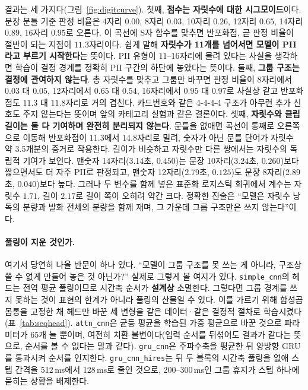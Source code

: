 \documentclass[10pt,twocolumn]{article}
\renewcommand{\emph}[1]{\textbf{#1}}
\begin{document}
결과는 세 가지다(그림~\ref{fig:digitcurve}). 첫째, \emph{점수는 자릿수에 대한 시그모이드}이다.
문장 문틀 기준 판정 비율은 4자리 $0.00$, 8자리 $0.03$, 10자리 $0.26$, 12자리 $0.65$, 14자리
$0.89$, 16자리 $0.95$로 오른다. 이 곡선에 S자 함수를 맞추면 반포화점, 곧 판정 비율이 절반이
되는 지점이 $11.3$자리이다. 쉽게 말해 \emph{자릿수가 11개를 넘어서면 모델이 PII라고 부르기
시작한다}는 뜻이다. PII 유형이
11--16자리에 몰려 있다는 사실을 생각하면 학습이 결정 경계를 정확히 PII 구간의 하단에 놓았다는
뜻이다. 둘째, \emph{그룹 구조는 결정에 관여하지 않는다}. 총 자릿수를 맞추고 그룹만 바꾸면 판정
비율이 8자리에서 $0.03$ 대 $0.05$, 12자리에서 $0.65$ 대 $0.54$, 16자리에서 $0.95$ 대 $0.97$로
사실상 같고 반포화점도 $11.3$ 대 $11.8$자리로 거의 겹친다. 카드번호와 같은 4-4-4-4 구조가
아무런 추가 신호도 주지 않는다는 뜻이며 앞의 카테고리 실험과 같은 결론이다. 셋째, \emph{자릿수와
클립 길이는 둘 다 기여하며 완전히 분리되지 않는다}. 문틀을 없애면 곡선이 통째로 오른쪽으로
이동해 반포화점이 $11.3$에서 $14.8$자리로 밀려, 숫자가 아닌 문틀 단어가 자릿수 약 3.5개분의
증거로 작용한다. 길이가 비슷하고 자릿수만 다른 쌍에서는 자릿수의 독립적 기여가 보인다. 맨숫자
14자리(3.14초, $0.450$)는 문장 10자리(3.24초, $0.260$)보다 짧으면서도 더 자주 PII로 판정되고,
맨숫자 12자리(2.79초, $0.125$)도 문장 8자리(2.89초, $0.040$)보다 높다. 그러나 두 변수를 함께
넣은 표준화 로지스틱 회귀에서 계수는 자릿수 $1.71$, 길이 $2.17$로 길이 쪽이 오히려 약간 크다.
정확한 진술은 ``모델은 자릿수 낭독의 분량과 발화 전체의 분량을 함께 재며, 그 가운데 그룹
구조만은 쓰지 않는다''이다.

\paragraph{풀링이 지운 것인가.}
여기서 당연히 나올 반문이 하나 있다. ``모델이 그룹 구조를 못 쓰는 게 아니라, 구조상 쓸 수 없게
만들어 놓은 것 아닌가?'' 실제로 그렇게 볼 여지가 있다. \texttt{simple\_cnn}의 헤드는 전역 평균
풀링이므로 시간축 순서가 \emph{설계상} 소멸한다. 그렇다면 그룹 경계를 쓰지 못하는 것이 표현의
한계가 아니라 풀링의 산물일 수 있다. 이를 가르기 위해 합성곱 몸통을 고정한 채 헤드만 바꾼 세
변형을 같은 데이터·같은 결정적 절차로 학습시켰다(표~\ref{tab:seqhead}). \texttt{attn\_cnn}은
균등 평균을 학습된 가중 평균으로 바꾼 것으로 파라미터가 65개 늘 뿐이며, 여전히 치환 불변이다(입력 순서를 뒤섞어도 결과가 같다는 뜻으로, 순서를 볼 수 없다는 말과 같다).
\texttt{gru\_cnn}은 주파수축을 평균한 뒤 양방향 GRU를 통과시켜 순서를 인지한다.
\texttt{gru\_cnn\_hires}는 뒤 두 블록의 시간축 풀링을 없애 스텝 간격을 512\,ms에서 128\,ms로
줄인 것으로, 200--300\,ms인 그룹 휴지가 스텝 하나에 묻히는 상황을 배제한다.
\end{document}
